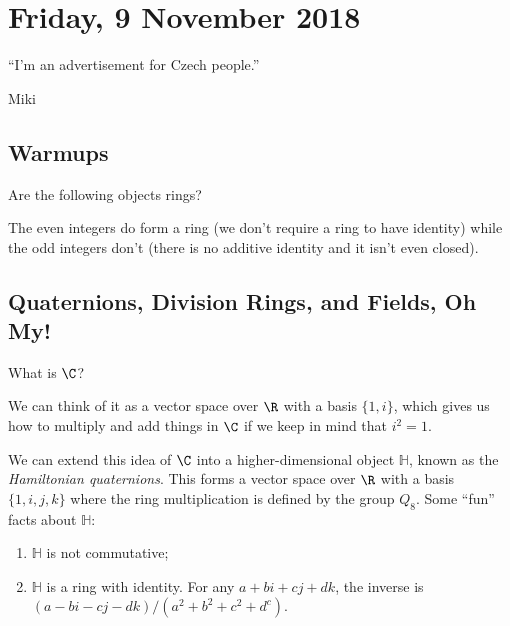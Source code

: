 \section{Friday, 9 November 2018}

\epigraph{``I'm an advertisement for Czech people.''}{Miki}

\subsection{Warmups}

\begin{exercise}
Are the following objects rings?
\end{exercise}

\begin{solution}
The even integers do form a ring (we don't require a ring to have identity) while the odd integers don't (there is no additive identity and it isn't even closed).
\end{solution}

\subsection{Quaternions, Division Rings, and Fields, Oh My!}

\begin{exercise}
What is $\C$?
\end{exercise}

\begin{solution}
We can think of it as a vector space over $\R$ with a basis $\{1,i\}$, which gives us how to multiply and add things in $\C$ if we keep in mind that $i^2 = 1$.
\end{solution}

We can extend this idea of $\C$ into a higher-dimensional object $\mathbb{H}$, known as the \emph{Hamiltonian quaternions}. This forms a vector space over $\R$ with a basis $\{1,i,j,k\}$ where the ring multiplication is defined by the group $Q_8$. Some ``fun'' facts about $\mathbb{H}$:
\begin{enumerate}
\item $\mathbb{H}$ is not commutative;
\item $\mathbb{H}$ is a ring with identity. For any $a + bi + cj + dk$, the inverse is $(a - bi - cj - dk)/(a^2+b^2+c^2+d^c)$.
\end{enumerate}

